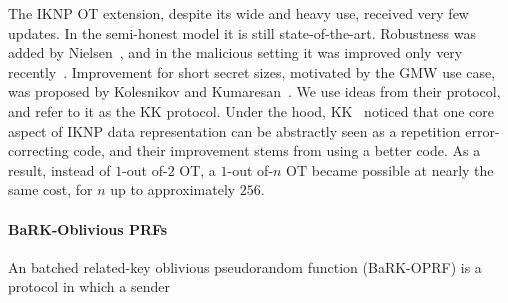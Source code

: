 The IKNP OT extension, despite its wide and heavy use, received very few updates.  In the semi-honest model it is still state-of-the-art.  Robustness was added by Nielsen~\cite{Nielsen07ot}, and in the malicious setting it was improved  only very recently~\cite{EC:ALSZ15,C:KelOrsSch15}.  Improvement for short secret sizes, motivated by the GMW use case, was proposed by Kolesnikov and Kumaresan~\cite{C:KolKum13}.   We use ideas from their protocol, and refer to it as the KK protocol.  Under the hood, KK~\cite{C:KolKum13} noticed that one core aspect of IKNP data representation can be abstractly seen as a repetition error-correcting code, and their improvement stems from using a better code.   As a result, instead of $1$-out of-$2$ OT, a $1$-out of-$n$  OT became possible at nearly the same cost,  for $n$ up to approximately $256$.


\paragraph{BaRK-Oblivious PRFs}

An batched related-key oblivious pseudorandom function (BaRK-OPRF) \cite{CCS:KKRT16} is a protocol in which a sender 


       


